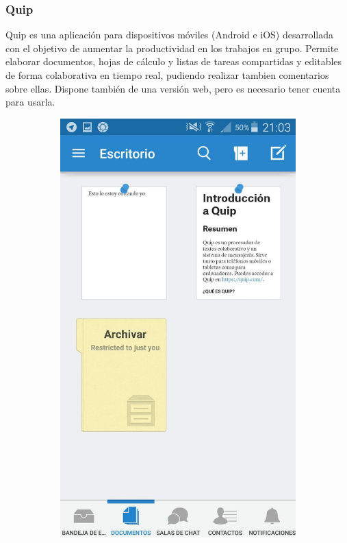	
	\subsubsection{Quip}
	
	Quip \cite{ref:quip} es una aplicación para dispositivos móviles (Android e iOS) desarrollada con el objetivo de aumentar la productividad en los trabajos en grupo. Permite elaborar documentos, hojas de cálculo y listas de tareas compartidas y editables de forma colaborativa en tiempo real, pudiendo realizar tambien comentarios sobre ellas. Dispone también de una versión web, pero es necesario tener cuenta para usarla.
	
	\begin{figure}[H]
        \centering
        \begin{subfigure}[b]{0.3\textwidth}
                \includegraphics[width=\textwidth]{Media/Captures/quipDesktop.jpg}

\end{subfigure}
\end{figure}

